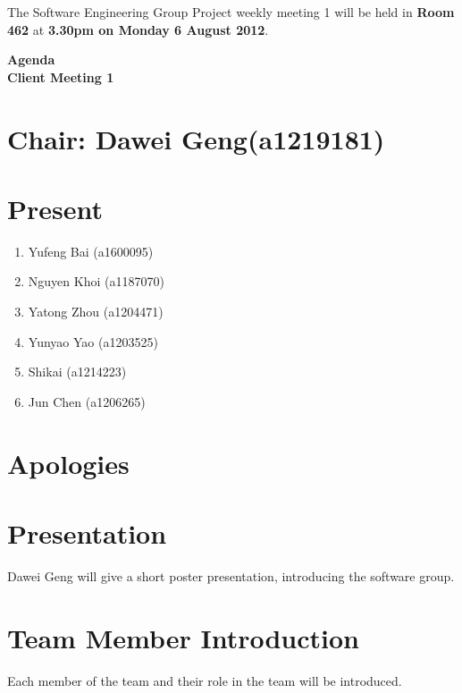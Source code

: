 \documentclass[11pt, a4paper]{article}
\begin{document}
\noindent The Software Engineering Group Project weekly meeting 1 will be held in {\bf Room 462} at {\bf 3.30pm on Monday 6 August 2012}.


\vspace*{15pt}

\begin{center}
\huge \bf Agenda \\Client Meeting 1
\end{center}



\section*{Chair: Dawei Geng(a1219181)}
\section*{Present}
\begin{enumerate}
\item Yufeng Bai (a1600095)
\item Nguyen Khoi (a1187070)
\item Yatong Zhou (a1204471)
\item Yunyao Yao (a1203525)
\item Shikai (a1214223)
\item Jun Chen (a1206265)
\end{enumerate}
\section{Apologies}

\section{Presentation}
Dawei Geng will give a short poster presentation, introducing the software group.

\section{Team Member Introduction}
Each member of the team and their role in the team will be introduced. 
\end{document}
